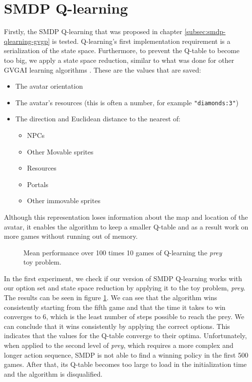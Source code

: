 \section{SMDP Q-learning}
\label{subsec:experiments-smdp-qlearning}
Firstly, the SMDP Q-learning that was proposed in chapter
\ref{subsec:smdp-qlearning-gvgp} is tested. Q-learning's first implementation
requirement is a serialization of the state space.  Furthermore, to prevent the
Q-table to become too big, we apply a state space reduction, similar to what was
done for other GVGAI learning algorithms \cite{samothrakis2015neuroevolution}.
These are the values that are saved:

\begin{itemize}
	\item The avatar orientation
	\item The avatar's resources (this is often a number, for example
		\texttt{"diamonds:3"})
	\item The direction and Euclidean distance to the nearest of:
		\begin{itemize}
			\item NPCs
			\item Other Movable sprites
			\item Resources
			\item Portals
			\item Other immovable sprites
		\end{itemize}
\end{itemize}

Although this representation loses information about the map and location
of the avatar, it enables the algorithm to keep a smaller Q-table and as a
result work on more games without running out of memory.

\begin{figure}
	\centering
	\caption{Mean performance over 100 times 10 games of Q-learning the
	\textit{prey} toy problem.}
	\label{fig:qlearning}
\end{figure}

In the first experiment, we check if our version of SMDP Q-learning works with
our option set and state space reduction by applying it to the toy problem,
\textit{prey}. The results can be seen in figure \ref{fig:qlearning}. We can see
that the algorithm wins consistently starting from the fifth game and that the
time it takes to win converges to 6, which is the least number of steps possible
to reach the prey.  We can conclude that it wins consistently by applying the
correct options. This indicates that the values for the Q-table converge to
their optima. Unfortunately, when applied to the second level of \textit{prey},
which requires a more complex and longer action sequence, SMDP is not able to
find a winning policy in the first 500 games. After that, its Q-table becomes
too large to load in the initialization time and the algorithm is disqualified.

